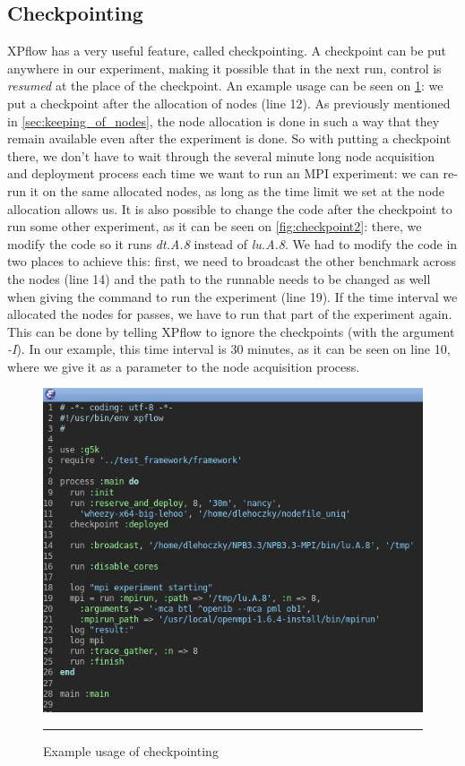 \subsection{Checkpointing}
XPflow has a very useful feature, called checkpointing. A checkpoint
can be put anywhere in our experiment, making it possible that in the
next run, control is \emph{resumed} at the place of the checkpoint. An
example usage can be seen on \ref{fig:checkpoint1}: we put a
checkpoint after the allocation of nodes (line 12). As previously
mentioned in \ref{sec:keeping_of_nodes}, the node allocation is done
in such a way that they remain available even after the experiment is
done. So with putting a checkpoint there, we don't have to wait
through the several minute long node acquisition and deployment
process each time we want to run an MPI experiment: we can re-run it
on the same allocated nodes, as long as the time limit we set at the
node allocation allows us. It is also possible to change the code
after the checkpoint to run some other experiment, as it can be seen
on \ref{fig:checkpoint2}: there, we modify the code so it runs
\emph{dt.A.8} instead of \emph{lu.A.8}. We had to modify the code in
two places to achieve this: first, we need to broadcast the other
benchmark across the nodes (line 14) and the path to the runnable
needs to be changed as well when giving the command to run the
experiment (line 19). If the time interval we allocated the nodes for
passes, we have to run that part of the experiment again. This can be
done by telling XPflow to ignore the checkpoints (with the argument
\emph{-I}). In our example, this time interval is 30 minutes, as it
can be seen on line 10, where we give it as a parameter to the node
acquisition process.
\begin{figure}[htbp]
  \centering
    \includegraphics[scale=0.7]{./Figures/checkpoint1.jpg}
    \rule{35em}{0.5pt}
  \caption[Checkpoint example]{Example usage of checkpointing}
  \label{fig:checkpoint1}
\end{figure}
